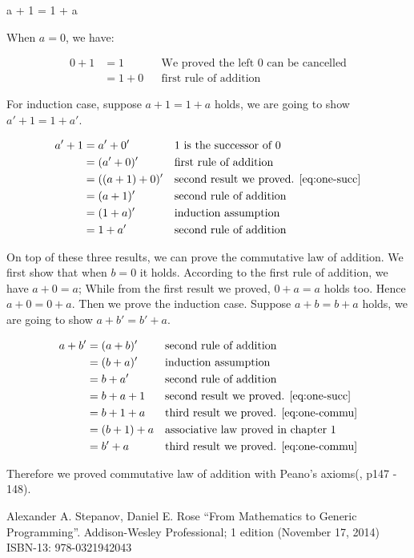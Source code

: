 \documentclass[UTF8]{article}
\begin{document}
\be
a + 1 = 1 + a
\label{eq:one-commu}
\ee

When $a = 0$, we have:

\begin{align*}
0 + 1 & = 1     && \text{We proved the left 0 can be cancelled} \\
      & = 1 + 0 && \text{first rule of addition}
\end{align*}

For induction case, suppose $a + 1 = 1 + a$ holds, we are going to show $a' + 1 = 1 + a'$.

\begin{align*}
a' + 1 & = a' + 0'        && \text{1 is the successor of 0} \\
       & = (a' + 0)'      && \text{first rule of addition} \\
       & = ((a + 1) + 0)' && \text{second result we proved. \cref{eq:one-succ}} \\
       & = (a + 1)'       && \text{second rule of addition} \\
       & = (1 + a)'       && \text{induction assumption} \\
       & = 1 + a'         && \text{second rule of addition}
\end{align*}

On top of these three results, we can prove the commutative law of addition. We first show that when $b = 0$ it holds. According to the first rule of addition, we have $a + 0 = a$; While from the first result we proved, $0 + a = a$ holds too. Hence $a + 0 = 0 + a$. Then we prove the induction case. Suppose $a + b = b + a$ holds, we are going to show $a + b' = b' + a$.

\begin{align*}
a + b' & = (a + b)' && \text{second rule of addition} \\
       & = (b + a)' && \text{induction assumption} \\
       & = b + a'   && \text{second rule of addition} \\
       & = b + a + 1 && \text{second result we proved. \cref{eq:one-succ}} \\
       & = b + 1 + a && \text{third result we proved. \cref{eq:one-commu}} \\
       & = (b + 1) + a && \text{associative law proved in chapter 1} \\
       & = b' + a  && \text{third result we proved. \cref{eq:one-commu}}
\end{align*}

Therefore we proved commutative law of addition with Peano's axioms(\cite{StepanovRose15}, p147 - 148).

\ifx\wholebook\relax \else
\begin{thebibliography}{99}

Alexander A. Stepanov, Daniel E. Rose ``From Mathematics to Generic Programming''. Addison-Wesley Professional; 1 edition (November 17, 2014) ISBN-13: 978-0321942043

\end{thebibliography}

\expandafter\enddocument

\fi
\end{document}
